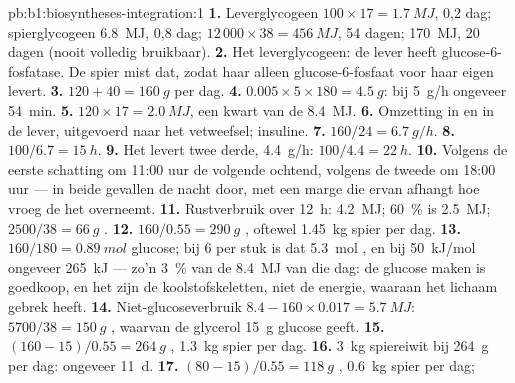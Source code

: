\begin{solution}{pb:b1:biosyntheses-integration:1}
\textbf{1.} Leverglycogeen $100\times 17 = \qty{1.7}{MJ}$, 0,2 dag;
spierglycogeen \qty{6.8}{MJ}, 0,8 dag;  $12\,000\times 38 =
\qty{456}{MJ}$, 54 dagen;  \qty{170}{MJ}, 20 dagen (nooit volledig bruikbaar).
\textbf{2.} Het leverglycogeen: de lever heeft glucose-6-fosfatase. De spier mist
dat, zodat haar  alleen glucose-6-fosfaat voor haar eigen 
levert.
\textbf{3.} $120 + 40 = \qty{160}{g}$ per dag.
\textbf{4.} $0.005\times 5\times 180 = \qty{4.5}{g}$: bij \qty{5}{g/h} ongeveer \qty{54}{min}.
\textbf{5.} $120\times 17 = \qty{2.0}{MJ}$, een kwart van de \qty{8.4}{MJ}.
\textbf{6.} Omzetting in  en  in de lever, uitgevoerd naar het
vetweefsel; insuline.
\textbf{7.} $160/24 = \qty{6.7}{g/h}$.
\textbf{8.} $100/6.7 = \qty{15}{h}$.
\textbf{9.} Het  levert twee derde, \qty{4.4}{g/h}: $100/4.4 =
\qty{22}{h}$.
\textbf{10.} Volgens de eerste schatting om 11:00 uur de volgende ochtend, volgens
de tweede om 18:00 uur --- in beide gevallen de nacht door, met een marge die
ervan afhangt hoe vroeg de  het overneemt.
\textbf{11.} Rustverbruik over \qty{12}{h}: \qty{4.2}{MJ}; \qty{60}{\%} is
\qty{2.5}{MJ}; $2500/38 = \qty{66}{g}$ .
\textbf{12.} $160/0.55 = \qty{290}{g}$ , oftewel \qty{1.45}{kg} spier per dag.
\textbf{13.} $160/180 = \qty{0.89}{mol}$ glucose; bij 6  per stuk is dat
\qty{5.3}{mol} , en bij \qty{50}{kJ/mol} ongeveer \qty{265}{kJ} --- zo'n
\qty{3}{\%} van de \qty{8.4}{MJ} van die dag: de glucose maken is goedkoop, en
het zijn de koolstofskeletten, niet de energie, waaraan het lichaam gebrek
heeft.
\textbf{14.} Niet-glucoseverbruik $8.4 - 160\times 0.017 =
\qty{5.7}{MJ}$: $5700/38 = \qty{150}{g}$ , waarvan de glycerol \qty{15}{g}
glucose geeft.
\textbf{15.} $(160 - 15)/0.55 = \qty{264}{g}$ , \qty{1.3}{kg} spier per dag.
\textbf{16.} \qty{3}{kg} spiereiwit bij \qty{264}{g} per dag: ongeveer \qty{11}{d}.
\textbf{17.} $(80 - 15)/0.55 = \qty{118}{g}$ , \qty{0.6}{kg} spier per dag;

\end{solution}
